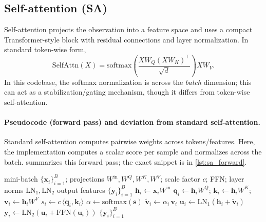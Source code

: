 \documentclass[11pt]{article}
\begin{document}
\subsection{Self-attention (SA)}
Self-attention projects the observation into a feature space and uses a compact Transformer-style block with residual connections and layer normalization. In standard token-wise form,
\begin{equation}
\mathrm{SelfAttn}(X)=\mathrm{softmax}\left(\frac{XW_Q(XW_K)^\top}{\sqrt{d}}\right)XW_V.
\end{equation}
In this codebase, the softmax normalization is across the \emph{batch} dimension; this can act as a stabilization/gating mechanism, though it differs from token-wise self-attention.

\paragraph{Pseudocode (forward pass) and deviation from standard self-attention.}
Standard self-attention computes pairwise weights across tokens/features. Here, the implementation computes a scalar score per sample and normalizes across the batch.  summarizes this forward pass; the exact snippet is in \cref{lst:sa_forward}.

\begin{algorithm}[t]
\caption{Self-attention feature extractor (forward pass; batch-normalized gating)}
\label{alg:sa_forward}
\begin{algorithmic}[1]
\Require mini-batch $\{\mathbf{x}_i\}_{i=1}^{B}$; projections $W^{\mathrm{in}},W^Q,W^K,W^V$; scale factor $c$; FFN; layer norms $\mathrm{LN}_1,\mathrm{LN}_2$
\Ensure output features $\{\mathbf{y}_i\}_{i=1}^{B}$
	\State $\mathbf{h}_i \gets \mathbf{x}_i W^{\mathrm{in}}$
	\State $\mathbf{q}_i \gets \mathbf{h}_i W^Q$; $\mathbf{k}_i \gets \mathbf{h}_i W^K$; $\mathbf{v}_i \gets \mathbf{h}_i W^V$
	\State $s_i \gets c\,\langle \mathbf{q}_i,\mathbf{k}_i\rangle$ 
\EndFor
\State $\alpha \gets \mathrm{softmax}(\mathbf{s})$ 
	\State $\tilde{\mathbf{v}}_i \gets \alpha_i\,\mathbf{v}_i$
	\State $\mathbf{u}_i \gets \mathrm{LN}_1(\mathbf{h}_i + \tilde{\mathbf{v}}_i)$
	\State $\mathbf{y}_i \gets \mathrm{LN}_2(\mathbf{u}_i + \mathrm{FFN}(\mathbf{u}_i))$
\EndFor
\State \Return $\{\mathbf{y}_i\}_{i=1}^{B}$
\end{algorithmic}
\end{algorithm}
\end{document}
